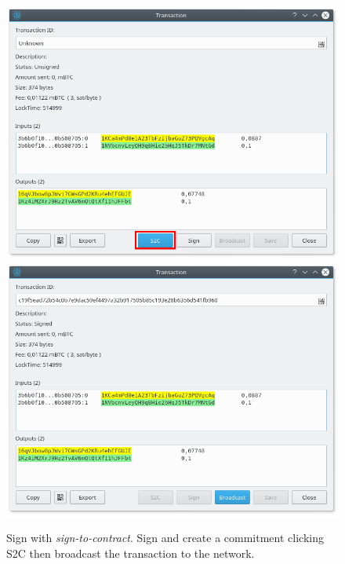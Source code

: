 \begin{figure}
	\begin{center}
		\includegraphics[width=0.9\linewidth]{Images/s2c.png}
		\includegraphics[width=0.9\linewidth]{Images/s2c-done.png}
		\caption[Sign with \textit{sign-to-contract}.]{Sign with \textit{sign-to-contract}. Sign and create a commitment clicking S2C then broadcast the transaction to the network.}
		\label{fig:s2c}
	\end{center}
\end{figure} 

